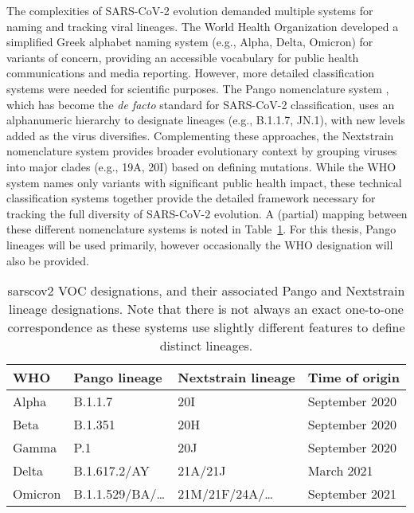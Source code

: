 The complexities of SARS-CoV-2 evolution demanded multiple systems for naming and tracking viral lineages.
The World Health Organization developed a simplified Greek alphabet naming system (e.g., Alpha, Delta, Omicron) for variants of concern, providing an accessible vocabulary for public health communications and media reporting.
However, more detailed classification systems were needed for scientific purposes.
The Pango nomenclature system \citep{o2021assignment,o2022pango}, which has become the \textit{de facto} standard for SARS-CoV-2 classification, uses an alphanumeric hierarchy to designate lineages (e.g., B.1.1.7, JN.1), with new levels added as the virus diversifies.
Complementing these approaches, the Nextstrain \citep{hadfield2018nextstrain,aksamentov2021nextclade} nomenclature system provides broader evolutionary context by grouping viruses into major clades (e.g., 19A, 20I) based on defining mutations.
While the WHO system names only variants with significant public health impact, these technical classification systems together provide the detailed framework necessary for tracking the full diversity of SARS-CoV-2 evolution.
A (partial) mapping between these different nomenclature systems is noted in Table~\ref{tab:variants}.
For this thesis, Pango lineages will be used primarily, however occasionally the WHO designation will also be provided.

\begin{table}[]
  \begin{tabular}{llll}
  \hline
  \textbf{WHO} & \textbf{Pango lineage} & \textbf{Nextstrain lineage} & \textbf{Time of origin} \\ \hline
  Alpha        & B.1.1.7                & 20I                         & September 2020          \\
  Beta         & B.1.351                & 20H                         & September 2020          \\
  Gamma        & P.1                    & 20J                         & September 2020          \\
  Delta        & B.1.617.2/AY           & 21A/21J                     & March 2021              \\
  Omicron      & B.1.1.529/BA/\ldots    & 21M/21F/24A/\ldots          & September 2021          \\
  \end{tabular}
  \caption{\gls{sarscov2} VOC designations, and their associated Pango and Nextstrain lineage designations. Note that there is not always an exact one-to-one correspondence as these systems use slightly different features to define distinct lineages.}
  \label{tab:variants}
\end{table}

